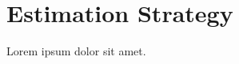 \documentclass[11pt]{article}
\begin{document}
\section{Estimation Strategy}
Lorem ipsum dolor sit amet. 

\end{document}
